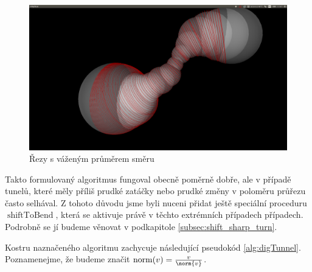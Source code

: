 \begin{figure}[ht]
    \centering
    \includegraphics[width=\textwidth]{img/weighted_dir.png}
    \caption{Řezy s váženým průměrem směru}
  \centering
  \label{fig:weighted_dir}
\end{figure}

Takto formulovaný algoritmus fungoval obecně poměrně dobře, ale v případě tunelů,
které měly příliš prudké zatáčky nebo prudké změny v poloměru průřezu často
selhával. Z tohoto důvodu jsme byli nuceni přidat ještě speciální proceduru
$ \operatorname{shiftToBend} $, která se aktivuje právě v těchto extrémních
případech případech. Podrobně se jí budeme věnovat v podkapitole \ref{subsec:shift_sharp_turn}.

Kostru naznačeného algoritmu zachycuje následující pseudokód \ref{alg:digTunnel}.
Poznamenejme, že budeme značit $ \operatorname{norm}(v) = \frac{v}{\norm{v}}$.

